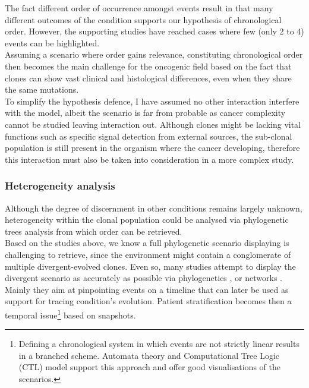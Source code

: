 The fact different order of occurrence amongst events result in that many different outcomes of the condition supports our hypothesis of chronological order. However, the supporting studies have reached cases where few (only 2 to 4) events can be highlighted.
\\

Assuming a scenario where order gains relevance, constituting chronological order then becomes the main challenge for the oncogenic field \cite{Gerstung2011TheTumorigenesis} based on the fact that clones can show vast clinical and histological differences, even when they share the same mutations. %
\\

To simplify the hypothesis defence, I have assumed no other interaction interfere with the model, albeit the scenario is far from probable as cancer complexity cannot be studied leaving interaction out. Although clones might be lacking vital functions such as specific signal detection from external sources, the sub-clonal population is still present in the organism where the cancer developing, therefore this interaction must also be taken into consideration in a more complex study.

\subsubsection{Heterogeneity analysis}
Although the degree of discernment in other conditions remains largely unknown, heterogeneity within the clonal population could be analysed via phylogenetic trees analysis from which order can be retrieved.
\\

Based on the studies above, we know a full phylogenetic scenario displaying is challenging to retrieve, since the environment might contain a conglomerate of multiple divergent-evolved clones. Even so, many studies attempt to display the divergent scenario as accurately as possible  via phylogenetics \cite{Beerenwinkel2005Mtreemix:Trees} \cite{Rahnenfuhrer2005EstimatingScores}, or networks \cite{Hjelm2006NewOncogenesis} \cite{Gerstung2011TheTumorigenesis}. Mainly they aim at pinpointing events on a timeline that can later be used as support for tracing condition's evolution. Patient stratification becomes then a temporal issue\footnote{Defining a chronological system in which events are not strictly linear results in a branched scheme. Automata theory and Computational Tree Logic (CTL) model support this approach and offer good visualisations of the scenarios.} based on snapshots.
\\

